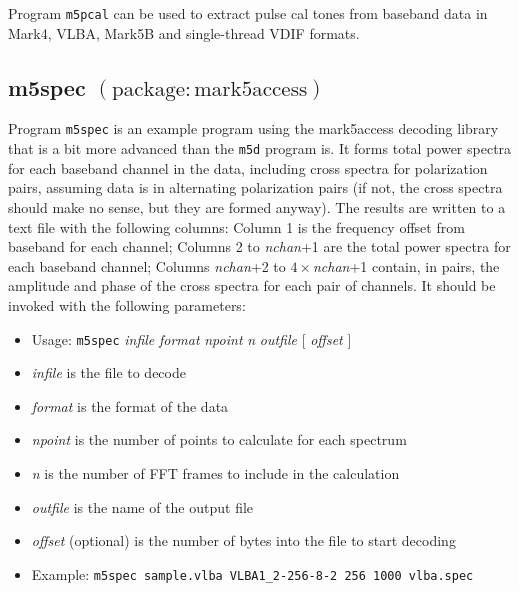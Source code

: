 Program {\tt m5pcal} can be used to extract pulse cal tones from baseband data in Mark4, VLBA, Mark5B and single-thread VDIF formats.









\subsection{m5spec {\small $\mathrm{(package: mark5access)}$}} \label{sec:m5spec}

Program {\tt m5spec} is an example program using the mark5access decoding library that is a bit more advanced than the {\tt m5d} program is.
It forms total power spectra for each baseband channel in the data, including cross spectra for polarization pairs, assuming data is in alternating polarization pairs (if not, the cross spectra should make no sense, but they are formed anyway).
The results are written to a text file with the following columns: Column 1 is the frequency offset from baseband for each channel; Columns 2 to {\em nchan}+1 are the total power spectra for each baseband channel; Columns {\em nchan}+2 to $4 \times${\em nchan}+1 contain, in pairs, the amplitude and phase of the cross spectra for each pair of channels.
It should be invoked with the following parameters:

\begin{itemize}
\item[] Usage: {\tt m5spec} {\em infile} {\em format} {\em npoint} {\em n} {\em outfile} $[$ {\em offset} $]$ 
\item[] {\em infile} is the file to decode
\item[] {\em format} is the format of the data
\item[] {\em npoint} is the number of points to calculate for each spectrum
\item[] {\em n} is the number of FFT frames to include in the calculation
\item[] {\em outfile} is the name of the output file
\item[] {\em offset} (optional) is the number of bytes into the file to start decoding
\item[] Example: {\tt m5spec sample.vlba VLBA1\_2-256-8-2 256 1000 vlba.spec}
\end{itemize}

